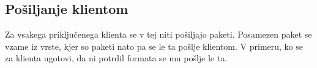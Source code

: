 \documentclass[journal]{IEEEtran}
\begin{document}
\subsection{Pošiljanje klientom}
Za vsakega priključenega klienta se v tej niti pošiljajo paketi. Posamezen paket se vzame iz vrste, kjer so paketi nato pa se le ta pošlje klientom. V primeru, ko se za klienta ugotovi, da ni potrdil formata se mu pošlje le ta.

%
%



%
%
\end{document}
